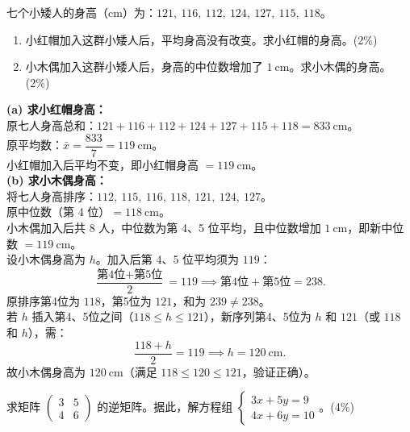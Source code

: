 \documentclass[12pt,a4paper]{exam-zh}
\begin{document}
\begin{question}
    七个小矮人的身高（cm）为：$121,\ 116,\ 112,\ 124,\ 127,\ 115,\ 118$。
    \begin{enumerate}[label=(\alph*)]
        \item 小红帽加入这群小矮人后，平均身高没有改变。求小红帽的身高。\hfill(2\%)
        \item 小木偶加入这群小矮人后，身高的中位数增加了 $1\ \text{cm}$。求小木偶的身高。\hfill(2\%)
    \end{enumerate}
\end{question}

\begin{solution}
    \textbf{(a) 求小红帽身高：} \\
    原七人身高总和：$121+116+112+124+127+115+118 = 833\ \text{cm}$。 \\
    原平均数：$\bar{x} = \dfrac{833}{7} = 119\ \text{cm}$。 \\
    小红帽加入后平均不变，即小红帽身高 $= 119\ \text{cm}$。 \\

    \textbf{(b) 求小木偶身高：} \\
    将七人身高排序：$112,\ 115,\ 116,\ 118,\ 121,\ 124,\ 127$。 \\
    原中位数（第 4 位）$= 118\ \text{cm}$。 \\
    小木偶加入后共 8 人，中位数为第 4、5 位平均，且中位数增加 $1\ \text{cm}$，即新中位数 $= 119\ \text{cm}$。 \\
    设小木偶身高为 $h$。加入后第 4、5 位平均须为 $119$：
    \[
        \frac{\text{第4位} + \text{第5位}}{2} = 119 \implies \text{第4位} + \text{第5位} = 238.
    \]
    原排序第4位为 $118$，第5位为 $121$，和为 $239 \ne 238$。 \\
    若 $h$ 插入第4、5位之间（$118 \le h \le 121$），新序列第4、5位为 $h$ 和 $121$（或 $118$ 和 $h$），需：
    \[
        \frac{118 + h}{2} = 119 \implies h = 120\ \text{cm}.
    \]
    故小木偶身高为 $120\ \text{cm}$（满足 $118 \le 120 \le 121$，验证正确）。
\end{solution}

\begin{question}[points = 4]
    求矩阵 $\displaystyle \begin{pmatrix} 3 & 5 \\ 4 & 6 \end{pmatrix}$ 的逆矩阵。据此，解方程组 $\displaystyle \begin{cases} 3x + 5y = 9 \\ 4x + 6y = 10 \end{cases}$。\hfill(4\%)
\end{question}
\end{document}
